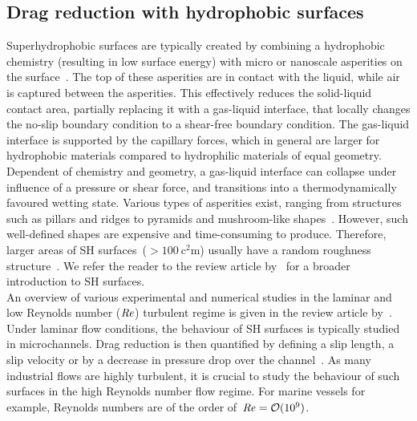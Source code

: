 \subsection{Drag reduction with {hydrophobic} surfaces}
Superhydrophobic surfaces are typically created by combining a hydrophobic chemistry (resulting in low surface energy) with micro or nanoscale asperities on the surface~\citep{Li2007}. The top of these asperities are in contact with the liquid, while air is captured between the asperities. This effectively reduces the solid-liquid contact area, partially replacing it with a gas-liquid interface, that locally changes the no-slip boundary condition to a shear-free boundary condition.
The gas-liquid interface is supported by the capillary forces, which in general are larger for hydrophobic materials compared to hydrophilic materials of equal geometry. Dependent of chemistry and geometry, a gas-liquid interface can collapse under influence of a pressure or shear force, and transitions into a thermodynamically favoured wetting state. Various types of asperities exist, ranging from structures such as pillars and ridges to pyramids and mushroom-like shapes~\citep{Peters2009,Qi2009,Park2014,Domingues2017}. However, such well-defined shapes are expensive and time-consuming to produce. Therefore, larger areas of SH surfaces~($>\SI{100}{\square\centi\metre}$) usually have a random roughness structure~\citep{Hokmabad2016}. We refer the reader to the review article by~\cite{Li2007} for a broader introduction to SH surfaces.\\

An overview of various experimental and numerical studies in the laminar and low Reynolds number ($\mbox{\textit{Re}}$) turbulent regime is given in the review article by~\cite{Rothstein2010}. Under laminar flow conditions, the behaviour of SH surfaces is typically studied in microchannels. Drag reduction is then quantified by defining a slip length, a slip velocity or by a decrease in pressure drop over the channel~\mbox{\citep{Tsai2009,Haase2013,Park2015}}. As many industrial flows are highly turbulent, it is crucial to study the behaviour of such surfaces in the high Reynolds number flow regime. For marine vessels for example, Reynolds numbers are of the order of~$\mbox{\textit{Re}} = \mathcal{O}(10^9)$.

